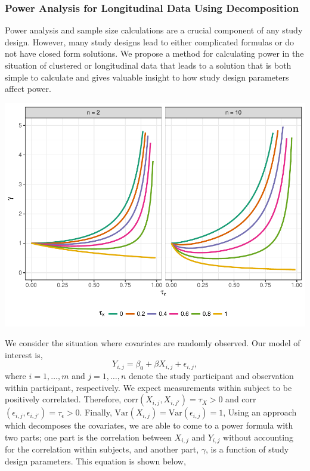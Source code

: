 \documentclass[11pt]{article}
\begin{document}
\begin{multicols}{2}
\subsubsection*{Power Analysis for Longitudinal Data Using Decomposition}
Power analysis and sample size calculations are a crucial component of any study design. However, many study designs lead to either complicated formulas or do not have closed form solutions. We propose a method for calculating power in the situation of clustered or longitudinal data that leads to a solution that is both simple to calculate and gives valuable insight to how study design parameters affect power.
\begin{center}\vspace{0cm}
\includegraphics[width=1\linewidth]{gamma_analysis.pdf}
\label{fig:gamma}
\end{center}\vspace{0cm}
\hspace{.5cm}We consider the situation where covariates are randomly observed. Our model of interest is,
\begin{equation} \label{eq:model}
Y_{i,j}=\beta_0+ \beta X_{i,j}+ \epsilon_{i,j},
\end{equation}
where $i=1,\ldots, m$ and $j=1,\ldots,n$ denote the study participant and observation within participant, respectively. We expect measurements within subject to be positively correlated. Therefore, corr$(X_{i,j},X_{i,j'}) = \tau_X >0$ and corr$(\epsilon_{i,j},\epsilon_{i,j'}) = \tau_\epsilon>0$. Finally, $\mbox{Var}(X_{i,j}) = \mbox{Var}(\epsilon_{i,j}) =1$, Using an approach which decomposes the covariates, we are able to come to a power formula with two parts; one part is the correlation between $X_{i,j}$ and $Y_{i,j}$ without accounting for the correlation within subjects, and another part, $\gamma$, is a function of study design parameters. This equation is shown below, 

\end{multicols}
\end{document}
